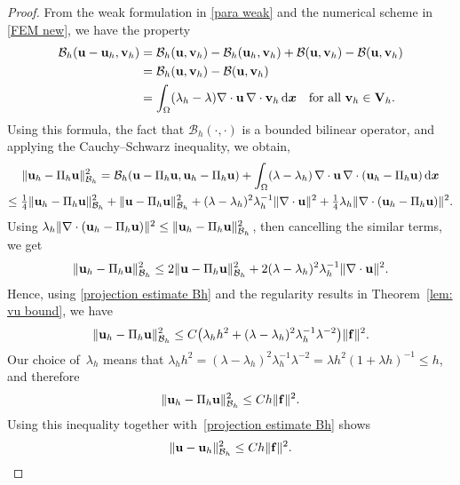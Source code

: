 \documentclass[11pt]{article}
\newcommand{\calB}{\mathcal{B}}
\newcommand{\vf}{{\bf f}}
\newcommand{\vu}{{\bf u}}
\newcommand{\vv}{{\bf v}}
\newcommand{\vV}{{\bf V}}
\newcommand{\bsx}{{\boldsymbol{x}}}
\numberwithin{equation}{section}
\newcommand{\ud}{\mathrm{d}}
\begin{document}
\begin{proof} 
From the weak formulation in \eqref{para weak} and the numerical scheme   in \eqref{FEM new}, we have the property 
\begin{align}\label{equ:Gal ort}
\calB_h(\vu-\vu_h, \vv_h) &= \calB_h(\vu, \vv_h)
    -\calB_h(\vu_h,\vv_h)+\calB(\vu,\vv_h)-\calB(\vu,\vv_h) \nonumber \\
&=\calB_h(\vu,\vv_h)-\calB(\vu,\vv_h)  \nonumber \\
&=\int_\Omega(\lambda_h-\lambda)\nabla\cdot\vu\,\nabla\cdot\vv_h\,\ud\bsx
\quad\text{for all $\vv_h \in \vV_h$.}
\end{align}
Using this formula, the fact that $\calB_h(\cdot, \cdot)$ is a bounded
bilinear operator, and applying the Cauchy--Schwarz inequality, we obtain,
\begin{multline*}
\|\vu_h-\Pi_h \vu\|_{\calB_h}^2=\calB_h(\vu-\Pi_h\vu,\vu_h-\Pi_h\vu)
    +\int_\Omega(\lambda-\lambda_h)\,\nabla\cdot\vu\,\nabla\cdot
    (\vu_h-\Pi_h\vu)\,\ud\bsx\\
    \le\tfrac14\|\vu_h-\Pi_h \vu\|_{\calB_h}^2+\|\vu-\Pi_h\vu\|_{\calB_h}^2
    +(\lambda-\lambda_h)^2\lambda_h^{-1}\|\nabla\cdot\vu\|^2
    +\tfrac{1}{4}\lambda_h\|\nabla\cdot(\vu_h-\Pi_h\vu)\|^2.
\end{multline*}
Using $\lambda_h\|\nabla\cdot(\vu_h-\Pi_h\vu)\|^2
\le\|\vu_h-\Pi_h\vu\|_{\calB_h}^2$, then cancelling the similar terms, we get
\[
\|\vu_h-\Pi_h\vu\|_{\calB_h}^2\le2\|\vu-\Pi_h\vu\|_{\calB_h}^2
    +2(\lambda-\lambda_h)^2\lambda_h^{-1}\|\nabla\cdot\vu\|^2.
\]
Hence, using \eqref{projection estimate Bh} and the regularity results in
Theorem~\ref{lem: vu bound},  we have
\begin{equation}\label{eq: balance terms}
\|\vu_h-\Pi_h \vu\|_{\calB_h}^2\le C\bigl(\lambda_hh^2
    +(\lambda-\lambda_h)^2\lambda_h^{-1}\lambda^{-2}\bigr)\|\vf\|^2.
\end{equation}
Our choice of~$\lambda_h$ means that
$\lambda_h h^2=(\lambda-\lambda_h)^2\lambda_h^{-1}\lambda^{-2}
    =\lambda h^2(1+\lambda h)^{-1}\le h$, and therefore
\begin{equation}\label{eq: uh Pih u}
\|\vu_h-\Pi_h \vu\|_{\calB_h}^2 \le Ch\|\vf\|^2.
\end{equation}
Using this inequality together with~\eqref{projection estimate Bh} shows
\begin{equation}\label{h1 error}
   \|\vu-\vu_h\|_{\calB_h}^2 \le Ch\|\vf\|^2.
\end{equation}


\end{proof}
\end{document}
